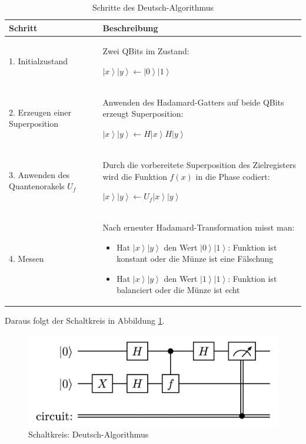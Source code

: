 \begin{table}[h]
    \centering
    \renewcommand{\arraystretch}{1.5}
    \begin{tabular}{p{3cm} p{8cm}}
        \textbf{Schritt} & \textbf{Beschreibung} \\ \hline
        1. Initialzustand &
        Zwei QBits im Zustand:
        
        \(\left|x\right\rangle\left|y\right\rangle \gets \left|0\right\rangle \left|1\right\rangle\)
        \\

        2. Erzeugen einer Superposition &
        Anwenden des Hadamard-Gatters auf beide QBits erzeugt Superposition:
        
        \(\left|x\right\rangle\left|y\right\rangle \gets H\left|x\right\rangle H\left|y\right\rangle\)
        \\

        3. Anwenden des Quantenorakels \(U_f\) &
        Durch die vorbereitete Superposition des Zielregisters wird die Funktion \(f(x)\) in die Phase codiert:
        
        \(\left|x\right\rangle\left|y\right\rangle \gets U_f\left|x\right\rangle\left|y\right\rangle\)
        \\

        4. Messen &
        Nach erneuter Hadamard-Transformation misst man:
        \begin{itemize}

         \item Hat $\left|x\right\rangle\left|y\right\rangle$ den Wert $\left|0\right\rangle\left|1\right\rangle$: Funktion ist konstant oder die Münze ist eine Fälschung
    
         \item Hat $\left|x\right\rangle\left|y\right\rangle$ den Wert $\left|1\right\rangle\left|1\right\rangle$: Funktion ist balanciert oder die Münze ist echt
    
     \end{itemize}
    \end{tabular}
    \caption{Schritte des Deutsch-Algorithmus}
    \label{tab:deutsch_algorithmus}
\end{table}

Daraus folgt der Schaltkreis in Abbildung \ref{fig:deutsch-schaltkreis}.
\begin{figure}
    \centering
    \includegraphics[width=1\linewidth]{images//quantum-information/deutsch schaltkreis.png}
    \caption{Schaltkreis: Deutsch-Algorithmus}
    \label{fig:deutsch-schaltkreis}
\end{figure}

